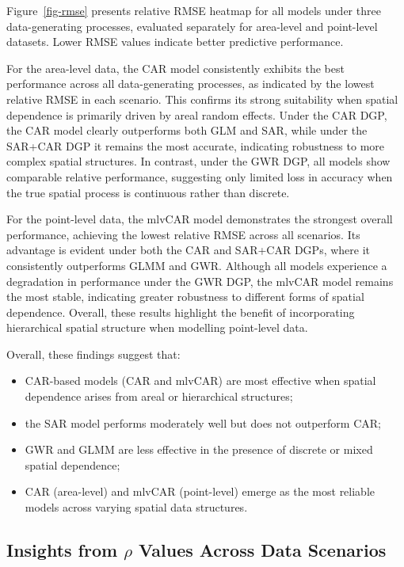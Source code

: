 \documentclass[a4paper,reqno]{amsart}
\begin{document}
Figure~\ref{fig-rmse} presents relative RMSE heatmap for all models under three
data-generating processes, evaluated separately
for area-level and point-level datasets. Lower RMSE values indicate
better predictive performance.

For the area-level data, the CAR model consistently exhibits the best performance across all data-generating processes, as indicated by the lowest relative RMSE in each scenario. This confirms its strong suitability when spatial dependence is primarily driven by areal random effects. Under the CAR DGP, the CAR model clearly outperforms both GLM and SAR, while under the SAR+CAR DGP it remains the most accurate, indicating robustness to more complex spatial structures. In contrast, under the GWR DGP, all models show comparable relative performance, suggesting only limited loss in accuracy when the true spatial process is continuous rather than discrete.

For the point-level data, the mlvCAR model demonstrates the strongest overall performance, achieving the lowest relative RMSE across all scenarios. Its advantage is evident under both the CAR and SAR+CAR DGPs, where it consistently outperforms GLMM and GWR. Although all models experience a degradation in performance under the GWR DGP, the mlvCAR model remains the most stable, indicating greater robustness to different forms of spatial dependence. Overall, these results highlight the benefit of incorporating hierarchical spatial structure when modelling point-level data.

Overall, these findings suggest that:
\begin{itemize}
\item CAR-based models (CAR and mlvCAR) are most effective when spatial
dependence arises from areal or hierarchical structures;
\item the SAR model performs moderately well but does not outperform CAR;
\item GWR and GLMM are less effective in the presence of discrete or
mixed spatial dependence;
\item CAR (area-level) and mlvCAR (point-level) emerge as the most
reliable models across varying spatial data structures.
\end{itemize}

\subsection{Insights from $\rho$ Values Across Data Scenarios}
\end{document}

